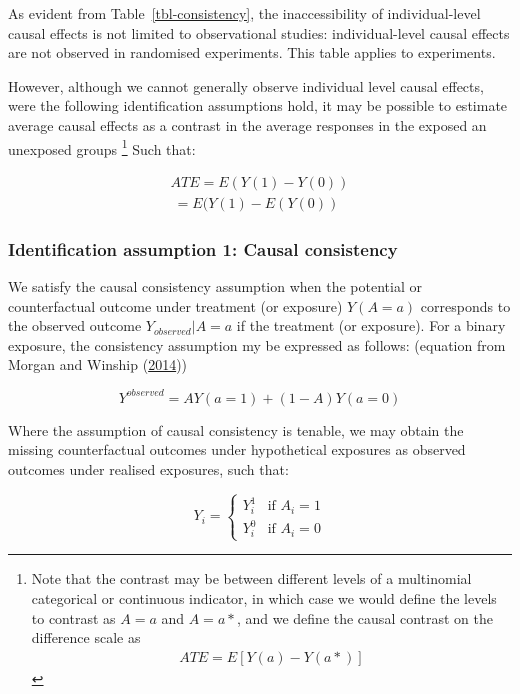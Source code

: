 \documentclass[
  singlecolumn]{report}
\begin{document}
As evident from Table~\ref{tbl-consistency}, the inaccessibility of
individual-level causal effects is not limited to observational studies:
individual-level causal effects are not observed in randomised
experiments. This table applies to experiments.

However, although we cannot generally observe individual level causal
effects, were the following identification assumptions hold, it may be
possible to estimate average causal effects as a contrast in the average
responses in the exposed an unexposed groups \footnote{Note that the
  contrast may be between different levels of a multinomial categorical
  or continuous indicator, in which case we would define the levels to
  contrast as \(A = a\) and \(A = a*\), and we define the causal
  contrast on the difference scale as \begin{align*}
  ATE = E[Y(a) - Y(a*)]
  \end{align*}} Such that:

\begin{align*}
ATE = E(Y(1) - Y(0))\\
          ~  = E(Y(1) - E(Y(0))
\end{align*}

\hypertarget{identification-assumption-1-causal-consistency}{%
\subsubsection{Identification assumption 1: Causal
consistency}\label{identification-assumption-1-causal-consistency}}

We satisfy the causal consistency assumption when the potential or
counterfactual outcome under treatment (or exposure) \(Y(A=a)\)
corresponds to the observed outcome \(Y_{observed}|A=a\) if the
treatment (or exposure). For a binary exposure, the consistency
assumption my be expressed as follows: (equation from Morgan and Winship
(\protect\hyperlink{ref-morgan2014}{2014}))

\[Y^{observed} = AY(a=1) + (1-A)Y(a=0)\]

Where the assumption of causal consistency is tenable, we may obtain the
missing counterfactual outcomes under hypothetical exposures as observed
outcomes under realised exposures, such that:

\[
Y_i = 
\begin{cases} 
Y_i^1 & \text{if } A_i = 1 \\
Y_i^0 & \text{if } A_i = 0 
\end{cases}
\]
\end{document}

